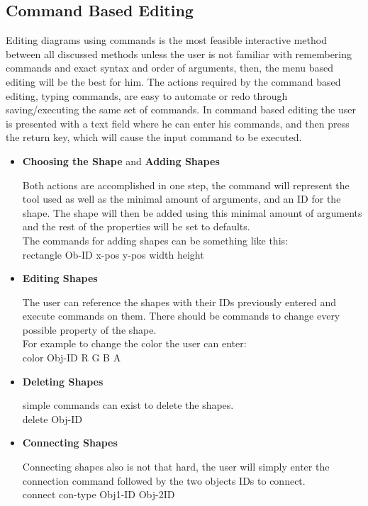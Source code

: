 \subsection{Command Based Editing}
Editing diagrams using commands is the most feasible interactive method between all discussed methods unless the user is not familiar with remembering commands and exact syntax and order of arguments, then, the menu based editing will be the best for him. The actions required by the command based editing, typing commands, are easy to automate or redo through saving/executing the same set of commands. In command based editing the user is presented with a text field where he can enter his commands, and then press the return key, which will cause the input command to be executed.

\begin{itemize}
\item {{\bf Choosing the Shape} and {\bf Adding Shapes}}
\par \noindent
Both actions are accomplished in one step, the command will represent the tool used as well as the minimal amount of arguments, and an ID for the shape. The shape will then be added using this minimal amount of arguments and the rest of the properties will be set to defaults.\\
The commands for adding shapes can be something like this:\\
rectangle Ob-ID x-pos y-pos width height

\item {\bf Editing Shapes}
\par \noindent
The user can reference the shapes with their IDs previously entered and execute commands on them. There should be commands to change every possible property of the shape.\\
For example to change the color the user can enter:\\
color Obj-ID R G B A

\item {\bf Deleting Shapes}
\par \noindent
simple commands can exist to delete the shapes.\\
delete Obj-ID

\item {\bf Connecting Shapes}
\par \noindent
Connecting shapes also is not that hard, the user will simply enter the connection command followed by the two objects IDs to connect.\\
connect con-type Obj1-ID Obj-2ID

\end{itemize}

